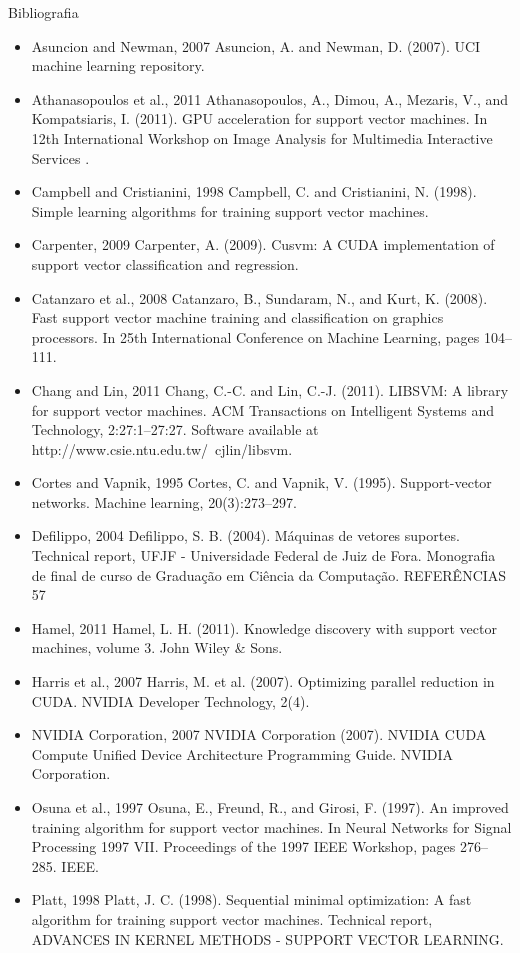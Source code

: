 \documentclass{beamer}
\begin{document}
\begin{frame}[allowframebreaks]{Bibliografia}
\begin{itemize}
    \item Asuncion and Newman, 2007 Asuncion, A. and Newman, D. (2007). UCI machine learning repository.
    \item Athanasopoulos et al., 2011 Athanasopoulos, A., Dimou, A., Mezaris, V., and Kompatsiaris, I. (2011). GPU acceleration for support vector machines. In 12th International Workshop on Image Analysis for Multimedia Interactive Services .
    \item Campbell and Cristianini, 1998 Campbell, C. and Cristianini, N. (1998). Simple learning algorithms for training support vector machines.
    \item Carpenter, 2009 Carpenter, A. (2009). Cusvm: A CUDA implementation of support vector classification and regression.
    \item Catanzaro et al., 2008 Catanzaro, B., Sundaram, N., and Kurt, K. (2008). Fast support vector machine training and classification on graphics processors. In 25th
International Conference on Machine Learning, pages 104–111.
\end{itemize}
\begin{itemize}
    \item Chang and Lin, 2011 Chang, C.-C. and Lin, C.-J. (2011). LIBSVM: A library for support vector machines. ACM Transactions on Intelligent Systems and Technology, 2:27:1–27:27. Software available at http://www.csie.ntu.edu.tw/~cjlin/libsvm.
    \item Cortes and Vapnik, 1995 Cortes, C. and Vapnik, V. (1995). Support-vector
networks. Machine learning, 20(3):273–297.
    \item Defilippo, 2004 Defilippo, S. B. (2004). Máquinas de vetores suportes. Technical
report, UFJF - Universidade Federal de Juiz de Fora. Monografia de final de curso
de Graduação em Ciência da Computação.
REFERÊNCIAS 57
    \item Hamel, 2011 Hamel, L. H. (2011). Knowledge discovery with support vector machines, volume 3. John Wiley \& Sons.
\end{itemize}
\begin{itemize}
    \item Harris et al., 2007 Harris, M. et al. (2007). Optimizing parallel reduction in
CUDA. NVIDIA Developer Technology, 2(4).
    \item NVIDIA Corporation, 2007 NVIDIA Corporation (2007). NVIDIA CUDA Compute Unified Device Architecture Programming Guide. NVIDIA Corporation.
    \item Osuna et al., 1997 Osuna, E., Freund, R., and Girosi, F. (1997). An improved training algorithm for support vector machines. In Neural Networks for Signal Processing 1997 VII. Proceedings of the 1997 IEEE Workshop, pages 276–285. IEEE.
    \item Platt, 1998 Platt, J. C. (1998). Sequential minimal optimization: A fast algorithm for training support vector machines. Technical report, ADVANCES IN KERNEL METHODS - SUPPORT VECTOR LEARNING.
\end{itemize}
\end{frame}
\end{document}
